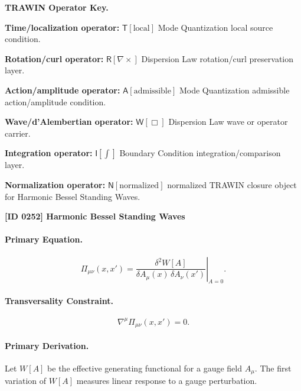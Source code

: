 \par\vspace{0.45\baselineskip}
\noindent\begin{minipage}[t]{\linewidth}
\begingroup
\small
\raggedright
\textbf{TRAWIN Operator Key.}\par
\noindent\textbf{Time/localization operator:} $\mathsf{T}\!\left[\mathrm{local}\right]$ Mode Quantization local source condition.\par
\noindent\textbf{Rotation/curl operator:} $\mathsf{R}\!\left[\nabla\times\right]$ Dispersion Law rotation/curl preservation layer.\par
\noindent\textbf{Action/amplitude operator:} $\mathsf{A}\!\left[\mathrm{admissible}\right]$ Mode Quantization admissible action/amplitude condition.\par
\noindent\textbf{Wave/d'Alembertian operator:} $\mathsf{W}\!\left[\Box\right]$ Dispersion Law wave or operator carrier.\par
\noindent\textbf{Integration operator:} $\mathsf{I}\!\left[\int\right]$ Boundary Condition integration/comparison layer.\par
\noindent\textbf{Normalization operator:} $\mathsf{N}\!\left[\mathrm{normalized}\right]$ normalized TRAWIN closure object for Harmonic Bessel Standing Waves.\par
\endgroup
\end{minipage}

\clearpage
\noindent\textbf{[ID 0252] Harmonic Bessel Standing Waves}\par
\vspace{0.35em}
\paragraph{Primary Equation.}
\begin{equation}
\Pi_{\mu\nu}(x,x')
=
\left.
\frac{\delta^2 W[A]}
{\delta A_\mu(x)\,\delta A_\nu(x')}
\right|_{A=0}.
\end{equation}

\paragraph{Transversality Constraint.}
\begin{equation}
\nabla^\mu \Pi_{\mu\nu}(x,x')=0 .
\end{equation}

\paragraph{Primary Derivation.}
Let $W[A]$ be the effective generating functional for a gauge field $A_\mu$.  
The first variation of $W[A]$ measures linear response to a gauge perturbation.

